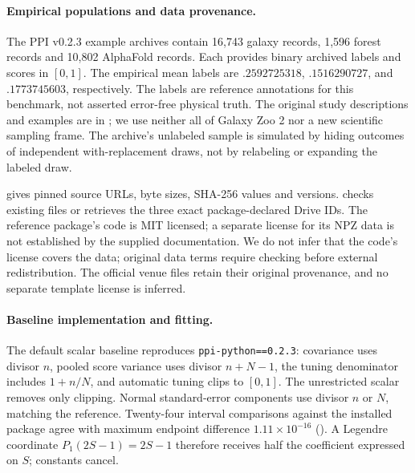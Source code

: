 \paragraph{Empirical populations and data provenance.}
The PPI v0.2.3 example archives contain 16,743 galaxy records, 1,596 forest records and 10,802 AlphaFold records. Each provides binary archived labels and scores in $[0,1]$. The empirical mean labels are $.2592725318$, $.1516290727$, and $.1773745603$, respectively. The labels are reference annotations for this benchmark, not asserted error-free physical truth. The original study descriptions and examples are in \citet{angelopoulos2023ppi}; we use neither all of Galaxy Zoo 2 nor a new scientific sampling frame. The archive's unlabeled sample is simulated by hiding outcomes of independent with-replacement draws, not by relabeling or expanding the labeled draw.

 gives pinned source URLs, byte sizes, SHA-256 values and versions.  checks existing files or retrieves the three exact package-declared Drive IDs. The reference package's code is MIT licensed; a separate license for its NPZ data is not established by the supplied documentation. We do not infer that the code's license covers the data; original data terms require checking before external redistribution. The official venue files retain their original provenance, and no separate template license is inferred.

\paragraph{Baseline implementation and fitting.}
The default scalar baseline reproduces \texttt{ppi-python==0.2.3}: covariance uses divisor $n$, pooled score variance uses divisor $n+N-1$, the tuning denominator includes $1+n/N$, and automatic tuning clips to $[0,1]$. The unrestricted scalar removes only clipping. Normal standard-error components use divisor $n$ or $N$, matching the reference. Twenty-four interval comparisons against the installed package agree with maximum endpoint difference $1.11\times10^{-16}$ (). A Legendre coordinate $P_1(2S-1)=2S-1$ therefore receives half the coefficient expressed on $S$; constants cancel.

